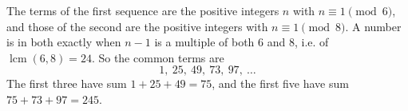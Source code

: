 The terms of the first sequence are the positive integers $n$ with $n\equiv1\pmod6$, and those of the second are the positive integers with $n\equiv1\pmod8$. A number is in both exactly when $n-1$ is a multiple of both $6$ and $8$, i.e. of $\operatorname{lcm}(6,8)=24$. So the common terms are
\[1,\ 25,\ 49,\ 73,\ 97,\ \dots\]
The first three have sum $1+25+49=\boxed{75}$, and the first five have sum $75+73+97=\boxed{245}$.
